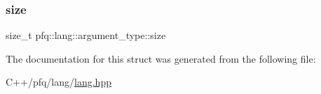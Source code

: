 \mbox{\label{structpfq_1_1lang_1_1argument__type_ae5d502317434728683578c32b6056275}} 
\subsubsection{\texorpdfstring{size}{size}}
{\footnotesize\ttfamily size\+\_\+t pfq\+::lang\+::argument\+\_\+type\+::size}



The documentation for this struct was generated from the following file\+:\begin{DoxyCompactItemize}
\item 
C++/pfq/lang/\hyperlink{lang_8hpp}{lang.\+hpp}\end{DoxyCompactItemize}
